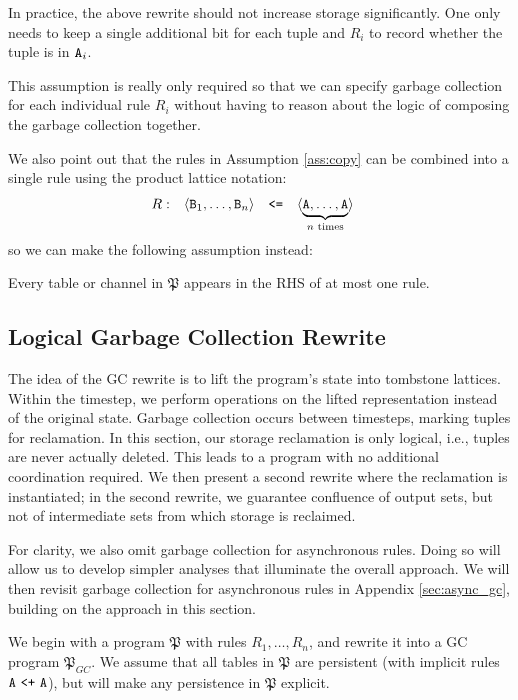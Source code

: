 In practice, the above rewrite should not increase storage significantly.
One only needs to keep a single additional bit for each tuple and $R_i$ to record whether the tuple is in $\tt{A}_i$.

This assumption is really only required so that we can specify garbage collection for each individual rule $R_i$ without having to reason about the logic of composing the garbage collection together.

We also point out that the rules in Assumption \ref{ass:copy} can be combined into a single rule using the product lattice notation:
\begin{align*}
R: && \langle \tt{B}_1, \dots, \tt{B}_n \rangle &\quad\tt{<=}\quad \langle \underbrace{\tt{A}, \dots, \tt{A}}_{\text{$n$ times}} \rangle
\end{align*}
so we can make the following assumption instead:
\begin{assumption}
\label{ass:single_rule}
Every table or channel in $\mathfrak{P}$ appears in the RHS of at most one rule.
\end{assumption}


\subsection{Logical Garbage Collection Rewrite}
The idea of the GC rewrite is to lift the program's state into tombstone lattices.
Within the timestep, we perform operations on the lifted representation instead of the original state.
Garbage collection occurs between timesteps, marking tuples for reclamation.
In this section, our storage reclamation is only logical, i.e., tuples are never actually deleted.
This leads to a program with no additional coordination required.
We then present a second rewrite where the reclamation is instantiated; in the second rewrite, we guarantee confluence of output sets, but not of intermediate sets from which storage is reclaimed.

For clarity, we also omit garbage collection for asynchronous rules.
Doing so will allow us to develop simpler analyses that illuminate the overall approach.
We will then revisit garbage collection for asynchronous rules in Appendix \ref{sec:async_gc}, building on the approach in this section.

We begin with a program $\mathfrak{P}$ with rules $R_1, \dots, R_n$, and rewrite it into a GC program $\mathfrak{P}_{GC}$.
We assume that all tables in $\mathfrak{P}$ are persistent (with implicit rules $\tt{A} ~\tt{<+}~ \tt{A}$), but will make any persistence in $\mathfrak{P}$ explicit.



